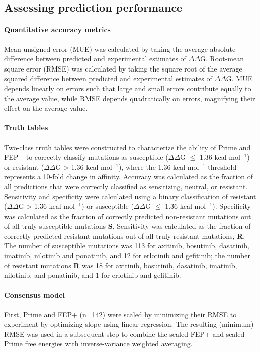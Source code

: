 \documentclass[phd,tocprelim]{cornell}
\begin{document}
\subsection{Assessing prediction performance}

\paragraph{Quantitative accuracy metrics}
Mean unsigned error (MUE) was calculated by taking the average absolute difference between predicted and experimental estimates of $\Delta\Delta$G. 
Root-mean square error (RMSE) was calculated by taking the square root of the average squared difference between predicted and experimental estimates of $\Delta\Delta$G. 
MUE depends linearly on errors such that large and small errors contribute equally to the average value, while RMSE depends quadratically on errors, magnifying their effect on the average value.

\paragraph{Truth tables}
Two-class truth tables were constructed to characterize the ability of Prime and FEP+ to correctly classify mutations as susceptible ($\Delta\Delta$G $\le$ 1.36 kcal mol$^{-1}$) or resistant ($\Delta\Delta$G > 1.36 kcal mol$^{-1}$), where the 1.36 kcal mol$^{-1}$ threshold represents a 10-fold change in affinity. 
Accuracy was calculated as the fraction of all predictions that were correctly classified as sensitizing, neutral, or resistant.
Sensitivity and specificity were calculated using a binary classification of resistant ($\Delta\Delta$G > 1.36 kcal mol$^{-1}$) or susceptible ($\Delta\Delta$G $\le$ 1.36 kcal mol$^{-1}$). 
Specificity was calculated as the fraction of correctly predicted non-resistant mutations out of all truly susceptible mutations {\bf S}.
Sensitivity was calculated as the fraction of correctly predicted resistant mutations out of all truly resistant mutations, {\bf R}. 
The number of susceptible mutations was 113 for axitinib, bosutinib, dasatinib, imatinib, nilotinib and ponatinib, and 12 for erlotinib and gefitinib; the number of resistant mutations {\bf R} was 18 for axitinib, bosutinib, dasatinib, imatinib, nilotinib, and ponatinib, and 1 for erlotinib and gefitinib.

\paragraph{Consensus model}
First, Prime and FEP+ (n=142) were scaled by minimizing their RMSE to experiment by optimizing slope using linear regression. The resulting (minimum) RMSE was used in a subsequent step to combine the scaled FEP+ and scaled Prime free energies with inverse-variance weighted averaging.
\end{document}
